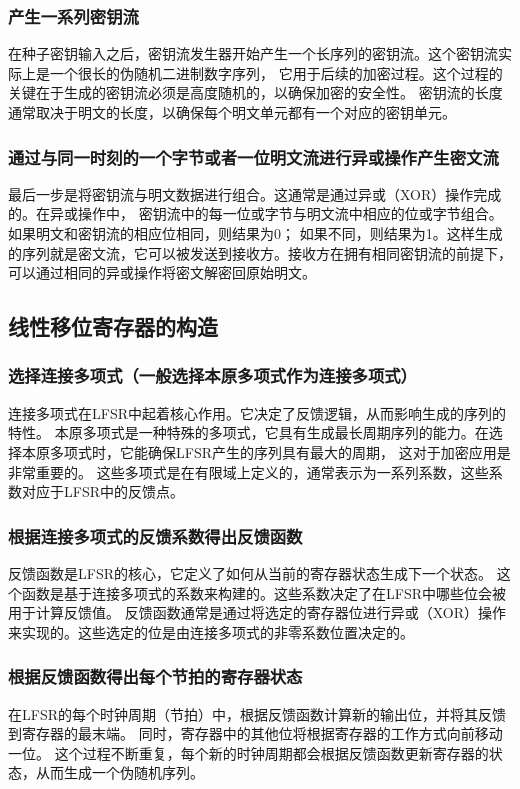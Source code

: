 \documentclass[a4paper,11pt,UTF8]{ctexart}
\begin{document}
    \subsubsection{产生一系列密钥流}
      在种子密钥输入之后，密钥流发生器开始产生一个长序列的密钥流。这个密钥流实际上是一个很长的伪随机二进制数字序列，
      它用于后续的加密过程。这个过程的关键在于生成的密钥流必须是高度随机的，以确保加密的安全性。
      密钥流的长度通常取决于明文的长度，以确保每个明文单元都有一个对应的密钥单元。
    \subsubsection{通过与同一时刻的一个字节或者一位明文流进行异或操作产生密文流}
      最后一步是将密钥流与明文数据进行组合。这通常是通过异或（XOR）操作完成的。在异或操作中，
      密钥流中的每一位或字节与明文流中相应的位或字节组合。如果明文和密钥流的相应位相同，则结果为0；
      如果不同，则结果为1。这样生成的序列就是密文流，它可以被发送到接收方。接收方在拥有相同密钥流的前提下，
      可以通过相同的异或操作将密文解密回原始明文。

  \subsection{线性移位寄存器的构造}

    \subsubsection{选择连接多项式（一般选择本原多项式作为连接多项式）}
      连接多项式在LFSR中起着核心作用。它决定了反馈逻辑，从而影响生成的序列的特性。
      本原多项式是一种特殊的多项式，它具有生成最长周期序列的能力。在选择本原多项式时，它能确保LFSR产生的序列具有最大的周期，
      这对于加密应用是非常重要的。
      这些多项式是在有限域上定义的，通常表示为一系列系数，这些系数对应于LFSR中的反馈点。
    \subsubsection{根据连接多项式的反馈系数得出反馈函数}
      反馈函数是LFSR的核心，它定义了如何从当前的寄存器状态生成下一个状态。
      这个函数是基于连接多项式的系数来构建的。这些系数决定了在LFSR中哪些位会被用于计算反馈值。
      反馈函数通常是通过将选定的寄存器位进行异或（XOR）操作来实现的。这些选定的位是由连接多项式的非零系数位置决定的。
    \subsubsection{根据反馈函数得出每个节拍的寄存器状态}
      在LFSR的每个时钟周期（节拍）中，根据反馈函数计算新的输出位，并将其反馈到寄存器的最末端。
      同时，寄存器中的其他位将根据寄存器的工作方式向前移动一位。
      这个过程不断重复，每个新的时钟周期都会根据反馈函数更新寄存器的状态，从而生成一个伪随机序列。
\end{document}

